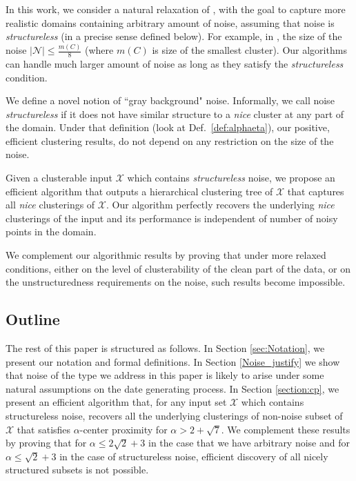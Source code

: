 \documentclass[orivec]{llncs}
\newcommand{\mc}{\mathcal}
\begin{document}
In this work, we consider a natural relaxation of \cite{balcan2012clustering,ben2014clustering}, with the goal to capture more realistic domains containing arbitrary amount of noise, assuming that noise is \emph{structureless} (in a precise sense defined below). For example, in \cite{balcan2012clustering}, the size of the noise $|\mc N| \le \frac{m(C)}{8}$ (where $m(C)$ is size of the smallest cluster). Our algorithms can handle much larger amount of noise as long as they satisfy the {\it structureless} condition.

We define a novel notion of ``gray background" noise. Informally, we call noise {\em structureless} if it does not have similar structure to a {\em nice} cluster at any part of the domain. Under that definition (look at Def.~\ref{def:alphaeta}), our positive, efficient clustering results, do not depend on any restriction on the size of the noise. 

Given a clusterable input $\mc X$ which contains {\em structureless} noise, we propose an efficient algorithm that outputs a hierarchical clustering tree of $\mc X$ that captures all {\em nice} clusterings of $\mc X$. Our algorithm perfectly recovers the underlying {\em nice} clusterings of the input and its performance is independent of number of noisy points in the domain. 

We complement our algorithmic results by proving that under more relaxed conditions, either on the level of clusterability of the clean part of the data, or on the unstructuredness requirements on the noise, such results become impossible. 


\subsection{Outline}

The rest of this paper is structured as follows. In Section \ref{sec:Notation}, we present our notation and formal definitions. In Section \ref{Noise_justify} we show that noise of the type we address in this paper is likely to arise under some natural assumptions on the date generating process. In Section \ref{section:cp}, we present an efficient algorithm that, for any input set $\mc X$ which contains structureless noise, recovers all the underlying clusterings of non-noise subset of $\mc X$ that satisfies $\alpha$-center proximity for $\alpha > 2+\sqrt{7}$. We complement these results by proving that for $\alpha \leq 2\sqrt{2}+3$ in the case that we have arbitrary noise and for $\alpha \leq \sqrt{2}+3$ in the case of structureless noise, efficient discovery of all nicely structured subsets is not possible.
\end{document}

